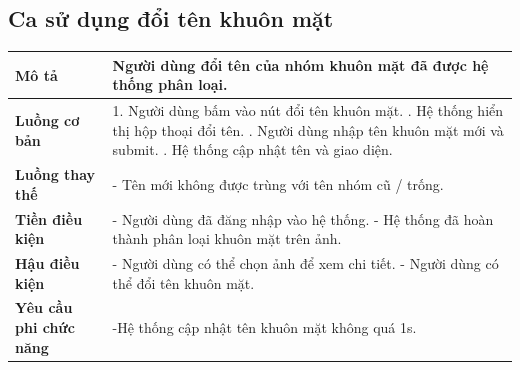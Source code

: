 \subsection{Ca sử dụng đổi tên khuôn mặt}

\vspace{0.5cm}

\noindent 
\begin{tabularx}{\linewidth}{| l | X |} 
\hline 
\textbf{Mô tả} & Người dùng đổi tên của nhóm khuôn mặt đã được hệ thống phân loại. \\
\hline 
\textbf{Luồng cơ bản} & 1. Người dùng bấm vào nút đổi tên khuôn mặt. \newline
                       2. Hệ thống hiển thị hộp thoại đổi tên. \newline
                       3. Người dùng nhập tên khuôn mặt mới và submit. \newline
                       5. Hệ thống cập nhật tên và giao diện. \\
\hline
\textbf{Luồng thay thế} & - Tên mới không được trùng với tên nhóm cũ / trống. \\
\hline
\textbf{Tiền điều kiện} & - Người dùng đã đăng nhập vào hệ thống. \newline
                          - Hệ thống đã hoàn thành phân loại khuôn mặt trên ảnh. \\
\hline
\textbf{Hậu điều kiện} & - Người dùng có thể chọn ảnh để xem chi tiết. \newline
                          - Người dùng có thể đổi tên khuôn mặt. \\
\hline 
\textbf{Yêu cầu phi chức năng} & -Hệ thống cập nhật tên khuôn mặt không quá 1s. \\
\hline 
\end{tabularx}

\vspace{0.8cm}

